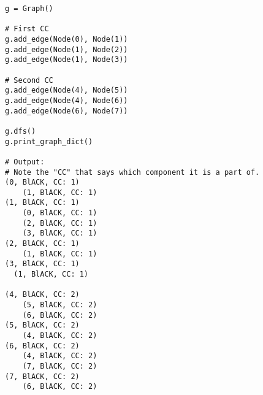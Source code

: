 \documentclass{article}
\begin{document}
\begin{enumerate}
    \begin{lstlisting}
g = Graph()

# First CC
g.add_edge(Node(0), Node(1))
g.add_edge(Node(1), Node(2))
g.add_edge(Node(1), Node(3))

# Second CC
g.add_edge(Node(4), Node(5))
g.add_edge(Node(4), Node(6))
g.add_edge(Node(6), Node(7))

g.dfs()
g.print_graph_dict()

# Output:
# Note the "CC" that says which component it is a part of.
(0, BlACK, CC: 1)
	(1, BlACK, CC: 1)
(1, BlACK, CC: 1)
	(0, BlACK, CC: 1)
	(2, BlACK, CC: 1)
	(3, BlACK, CC: 1)
(2, BlACK, CC: 1)
	(1, BlACK, CC: 1)
(3, BlACK, CC: 1)
  (1, BlACK, CC: 1)
  
(4, BlACK, CC: 2)
	(5, BlACK, CC: 2)
	(6, BlACK, CC: 2)
(5, BlACK, CC: 2)
	(4, BlACK, CC: 2)
(6, BlACK, CC: 2)
	(4, BlACK, CC: 2)
	(7, BlACK, CC: 2)
(7, BlACK, CC: 2)
	(6, BlACK, CC: 2)
    \end{lstlisting}

  \end{enumerate} %
\end{document}
